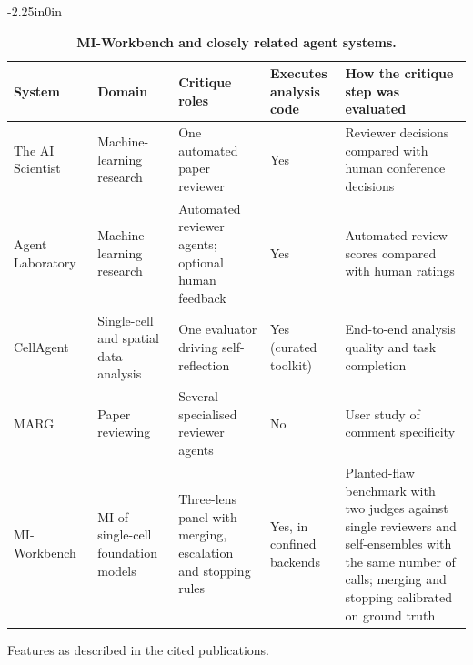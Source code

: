 \begin{table}[!ht]
\begin{adjustwidth}{-2.25in}{0in}
\centering
\caption{{\bf MI-Workbench and closely related agent systems.}}
\label{table_related}
\begin{tabular}{@{}>{\raggedright\arraybackslash}p{2.7cm}>{\raggedright\arraybackslash}p{2.5cm}>{\raggedright\arraybackslash}p{3.2cm}>{\raggedright\arraybackslash}p{2.0cm}>{\raggedright\arraybackslash}p{4.6cm}@{}}
\hline
\textbf{System} & \textbf{Domain} & \textbf{Critique roles} & \textbf{Executes analysis code} & \textbf{How the critique step was evaluated} \\ \hline
The AI Scientist~\cite{lu2024aiscientist,lu2026aiscientist,yamada2025aiscientistv2} & Machine-learning research & One automated paper reviewer & Yes & Reviewer decisions compared with human conference decisions \\
Agent Laboratory~\cite{schmidgall2025agentlab} & Machine-learning research & Automated reviewer agents; optional human feedback & Yes & Automated review scores compared with human ratings \\
CellAgent~\cite{xiao2024cellagent,xiao2026cellagent} & Single-cell and spatial data analysis & One evaluator driving self-reflection & Yes (curated toolkit) & End-to-end analysis quality and task completion \\
MARG~\cite{darcy2024marg} & Paper reviewing & Several specialised reviewer agents & No & User study of comment specificity \\
MI-Workbench & MI of single-cell foundation models & Three-lens panel with merging, escalation and stopping rules & Yes, in confined backends & Planted-flaw benchmark with two judges against single reviewers and self-ensembles with the same number of calls; merging and stopping calibrated on ground truth \\ \hline
\end{tabular}
\begin{flushleft} Features as described in the cited publications.
\end{flushleft}
\end{adjustwidth}
\end{table}
